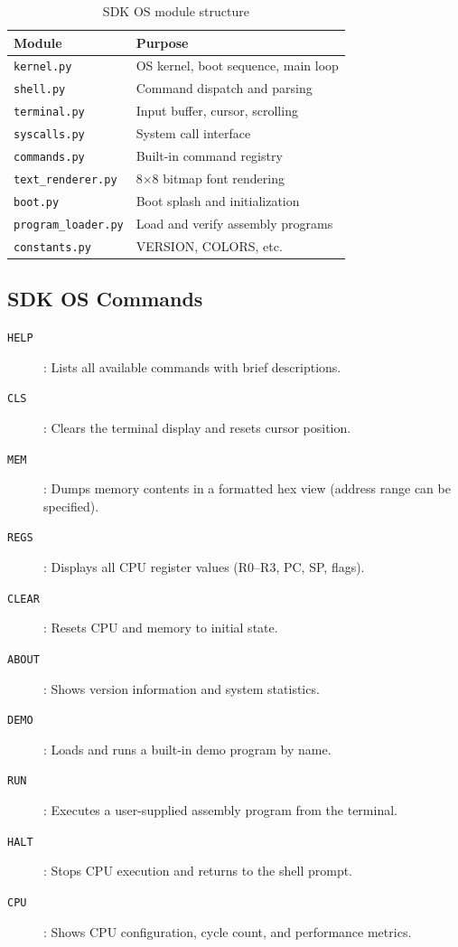 \documentclass[10pt,a4paper,twoside]{book}
\begin{document}
\begin{table}[H]
\centering
\caption{SDK OS module structure}
\label{tab:sdkos}
\begin{tabular}{ll}
\toprule
Module & Purpose \\
\midrule
\texttt{kernel.py} & OS kernel, boot sequence, main loop \\
\texttt{shell.py} & Command dispatch and parsing \\
\texttt{terminal.py} & Input buffer, cursor, scrolling \\
\texttt{syscalls.py} & System call interface \\
\texttt{commands.py} & Built-in command registry \\
\texttt{text\_renderer.py} & 8$\times$8 bitmap font rendering \\
\texttt{boot.py} & Boot splash and initialization \\
\texttt{program\_loader.py} & Load and verify assembly programs \\
\texttt{constants.py} & VERSION, COLORS, etc. \\
\bottomrule
\end{tabular}
\end{table}

\subsection{SDK OS Commands}

\begin{description}
    \item[\texttt{HELP}]: Lists all available commands with brief descriptions.
    \item[\texttt{CLS}]: Clears the terminal display and resets cursor position.
    \item[\texttt{MEM}]: Dumps memory contents in a formatted hex view (address range
          can be specified).
    \item[\texttt{REGS}]: Displays all CPU register values (R0--R3, PC, SP, flags).
    \item[\texttt{CLEAR}]: Resets CPU and memory to initial state.
    \item[\texttt{ABOUT}]: Shows version information and system statistics.
    \item[\texttt{DEMO}]: Loads and runs a built-in demo program by name.
    \item[\texttt{RUN}]: Executes a user-supplied assembly program from the terminal.
    \item[\texttt{HALT}]: Stops CPU execution and returns to the shell prompt.
    \item[\texttt{CPU}]: Shows CPU configuration, cycle count, and performance metrics.
\end{description}
\end{document}
